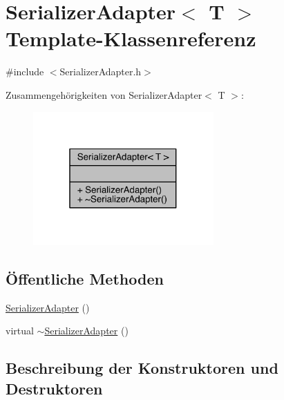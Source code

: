 \hypertarget{class_serializer_adapter}{}\section{Serializer\+Adapter$<$ T $>$ Template-\/\+Klassenreferenz}
\label{class_serializer_adapter}


{\ttfamily \#include $<$Serializer\+Adapter.\+h$>$}



Zusammengehörigkeiten von Serializer\+Adapter$<$ T $>$\+:\nopagebreak
\begin{figure}[H]
\begin{center}
\leavevmode
\includegraphics[width=196pt]{class_serializer_adapter__coll__graph}
\end{center}
\end{figure}
\subsection*{Öffentliche Methoden}
\begin{DoxyCompactItemize}
\item 
\hyperlink{class_serializer_adapter_ac815cf2eb9414d93eae850d1d31c7120}{Serializer\+Adapter} ()
\item 
virtual \hyperlink{class_serializer_adapter_ab768851e14fa435e50f4d39faacaea89}{$\sim$\+Serializer\+Adapter} ()
\end{DoxyCompactItemize}


\subsection{Beschreibung der Konstruktoren und Destruktoren}
\hypertarget{class_serializer_adapter_ac815cf2eb9414d93eae850d1d31c7120}{}\label{class_serializer_adapter_ac815cf2eb9414d93eae850d1d31c7120} 
